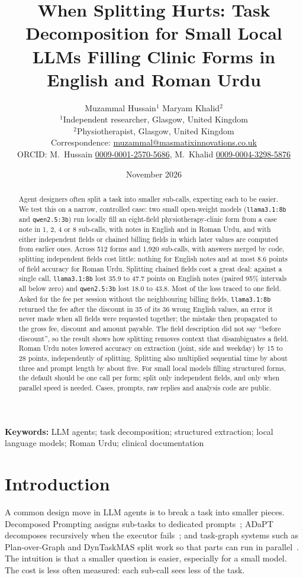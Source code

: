 \documentclass[11pt,a4paper]{article}
\title{\textbf{When Splitting Hurts: Task Decomposition for Small Local\\LLMs Filling Clinic Forms in English and Roman Urdu}}
\author{Muzammal Hussain$^{1}$ \qquad Maryam Khalid$^{2}$\\[4pt]
\small $^{1}$Independent researcher, Glasgow, United Kingdom\\
\small $^{2}$Physiotherapist, Glasgow, United Kingdom\\
\small Correspondence: \href{mailto:muzammal@masmatixinnovations.co.uk}{muzammal@masmatixinnovations.co.uk}\\
\small ORCID: M.\ Hussain \href{https://orcid.org/0009-0001-2570-5686}{0009-0001-2570-5686}, M.\ Khalid \href{https://orcid.org/0009-0004-3298-5876}{0009-0004-3298-5876}}
\date{\small November 2026}
\newcommand{\code}[1]{\texttt{#1}}
\begin{document}
\maketitle

\begin{abstract}
\noindent
Agent designers often split a task into smaller sub-calls, expecting each to be easier. We test this on a narrow,
controlled case: two small open-weight models (\code{llama3.1:8b} and \code{qwen2.5:3b}) run locally fill an
eight-field physiotherapy-clinic form from a case note in 1, 2, 4 or 8 sub-calls, with notes in English and in Roman
Urdu, and with either independent fields or chained billing fields in which later values are computed from earlier
ones. Across 512 forms and 1,920 sub-calls, with answers merged by code, splitting independent fields cost little:
nothing for English notes and at most 8.6 points of field accuracy for Roman Urdu. Splitting chained fields cost a
great deal: against a single call, \code{llama3.1:8b} lost 35.9 to 47.7 points on English notes (paired 95\%
intervals all below zero) and \code{qwen2.5:3b} lost 18.0 to 43.8. Most of the loss traced to one field. Asked for the
fee per session without the neighbouring billing fields, \code{llama3.1:8b} returned the fee after the discount in 35
of its 36 wrong English values, an error it never made when all fields were requested together; the mistake then
propagated to the gross fee, discount and amount payable. The field description did not say ``before discount'', so
the result shows how splitting removes context that disambiguates a field. Roman Urdu notes lowered accuracy on
extraction (joint, side and weekday) by 15 to 28 points, independently of splitting. Splitting also multiplied
sequential time by about three and prompt length by about five. For small local models filling structured forms,
the default should be one call per form; split only independent fields, and only when parallel speed is needed.
Cases, prompts, raw replies and analysis code are public.
\end{abstract}

\noindent\textbf{Keywords:} LLM agents; task decomposition; structured extraction; local language models; Roman Urdu; clinical documentation

\section{Introduction}

A common design move in LLM agents is to break a task into smaller pieces. Decomposed Prompting assigns sub-tasks
to dedicated prompts~\cite{khot2023decomposed}; ADaPT decomposes recursively when the executor
fails~\cite{prasad2023adapt}; and task-graph systems such as Plan-over-Graph and DynTaskMAS split work so that parts
can run in parallel~\cite{zhang2025plangraph,yu2025dyntaskmas}. The intuition is that a smaller question is easier,
especially for a small model. The cost is less often measured: each sub-call sees less of the task.
\end{document}
